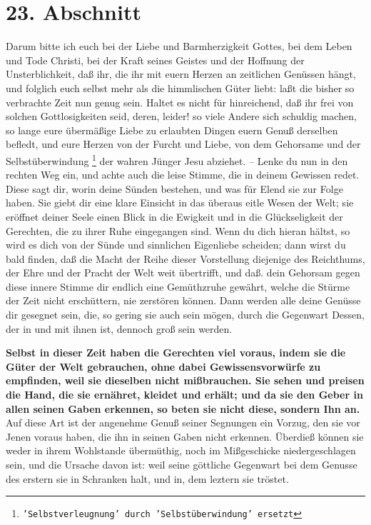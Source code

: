 \section{23. Abschnitt} \label{kap4_ab23}

Darum bitte ich euch bei der Liebe und Barmherzigkeit Gottes, bei dem Leben und
Tode Christi, bei der Kraft seines Geistes und der Hoffnung der Unsterblichkeit,
daß ihr, die ihr mit euern Herzen an zeitlichen Genüssen hängt, und folglich
euch selbst mehr als die himmlischen Güter liebt: laßt die bisher so
verbrachte Zeit nun genug sein. Haltet es nicht für hinreichend, daß ihr frei
von solchen Gottlosigkeiten seid, deren, leider! so viele Andere sich schuldig
machen, so lange eure übermäßige Liebe zu erlaubten Dingen euern Genuß derselben
befledt, und eure Herzen von der Furcht und Liebe, von dem Gehorsame und der
Selbstüberwindung \footnote{\texttt{'Selbstverleugnung' durch 'Selbstüberwindung' ersetzt}} der wahren Jünger Jesu abziehet. -- Lenke du nun in den
rechten Weg ein, und achte auch die leise Stimme, die in deinem Gewissen redet.
Diese sagt dir, worin deine Sünden bestehen, und was für Elend sie zur Folge
haben. Sie giebt dir eine klare Einsicht in das überaus eitle Wesen der Welt;
sie eröffnet deiner Seele einen Blick in die Ewigkeit und in die Glückseligkeit
der Gerechten, die zu ihrer Ruhe eingegangen sind. Wenn du dich hieran hältst,
so wird es dich von der Sünde und sinnlichen Eigenliebe scheiden; dann wirst du
bald finden, daß die Macht der Reihe dieser Vorstellung diejenige des
Reichthums, der Ehre und der Pracht der Welt weit übertrifft, und daß. dein
Gehorsam gegen diese innere Stimme dir endlich eine Gemüthzruhe gewährt, welche
die Stürme der Zeit nicht erschüttern, nie zerstören können. Dann werden alle
deine Genüsse dir gesegnet sein, die, so gering sie auch sein mögen, durch die
Gegenwart Dessen, der in und mit ihnen ist, dennoch groß sein werden.

\medskip

\textbf{Selbst in dieser Zeit haben die Gerechten viel voraus, indem sie die
Güter der
Welt gebrauchen, ohne dabei Gewissensvorwürfe zu empfinden, weil sie dieselben
nicht mißbrauchen. Sie sehen und preisen die Hand, die sie ernähret, kleidet und
erhält; und da sie den Geber in allen seinen Gaben erkennen, so beten sie nicht
diese, sondern Ihn an.} Auf diese Art ist der angenehme Genuß seiner Segnungen
ein Vorzug, den sie vor Jenen voraus haben, die ihn in seinen Gaben nicht
erkennen. Überdieß können sie weder in ihrem Wohlstande übermüthig, noch im
Mißgeschicke niedergeschlagen sein, und die Ursache davon ist: weil seine
göttliche Gegenwart bei dem Genusse des erstern sie in Schranken halt, und in,
dem leztern sie tröstet.

